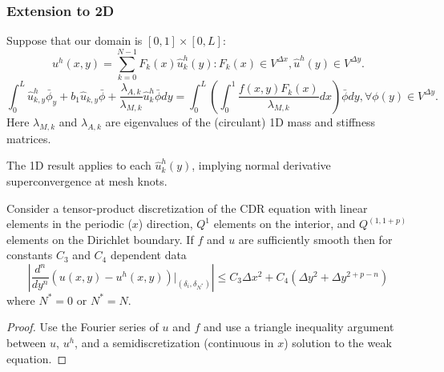 \documentclass[8pt]{beamer}
\begin{document}
    \begin{frame}
        \frametitle{Extension to 2D}
        Suppose that our domain is \([0, 1] \times [0, L]\):
        \begin{equation*}
            u^h(x, y) = \sum_{k = 0}^{N - 1} F_k(x) \hat{u}^h_k(y) :
            F_k(x) \in V^{\Delta x},
            \hat{u}^h(y) \in V^{\Delta y}.
        \end{equation*}
        \pause
        \begin{equation*}
            \int_0^L
            \hat{u}^h_{k, y} \bar{\phi}_y
            + b_1 \hat{u}_{k, y} \bar{\phi}
            + \dfrac{\lambda_{A, k}}{\lambda_{M, k}}
            \hat{u}^h_k \bar{\phi} dy
            =
            \int_0^L
            \left(
            \int_0^1
            \dfrac{f(x, y) F_k(x)}{\lambda_{M, k}} dx
            \right)
            \bar{\phi} dy,
            \forall \phi(y) \in V^{\Delta y}.
        \end{equation*}
        Here \(\lambda_{M,k}\) and \(\lambda_{A,k}\) are eigenvalues of the
        (circulant) 1D mass and stiffness matrices.
        \pause
        \vspace{0.25in}

        The 1D result applies to each \(\hat{u}^h_k(y)\), implying normal
        derivative superconvergence at mesh knots.
    \end{frame}

    \begin{frame}
        \begin{theorem}
            Consider a tensor-product discretization of the CDR equation with
            linear elements in the periodic (\(x\)) direction, \(Q^1\) elements
            on the interior, and \(Q^{(1, 1 + p)}\) elements on the Dirichlet
            boundary. If \(f\) and \(u\) are sufficiently smooth then for
            constants \(C_3\) and \(C_4\) dependent data
            \begin{equation*}
                \left|
                \dfrac{d^n}{dy^n}
                \left(u(x, y) - u^h(x, y) \right)
                \bigg|_{(\delta_i, \delta_{N^*})}
                \right|
                \leq
                C_3 \Delta x^2
                +
                C_4 (\Delta y^2 + \Delta y^{2 + p - n})
            \end{equation*}
            where \(N^* = 0\) or \(N^* = N\).

            \begin{proof}
                Use the Fourier series of \(u\) and \(f\) and use a triangle
                inequality argument between \(u\), \(u^h\), and a
                semidiscretization (continuous in \(x\)) solution to the weak
                equation.
            \end{proof}
        \end{theorem}
    \end{frame}
\end{document}
